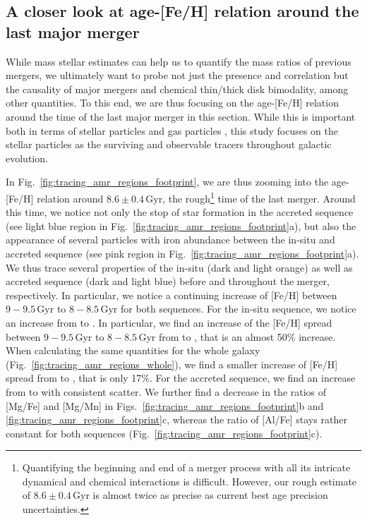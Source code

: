 \documentclass[fleqn,usenatbib]{mnras}
\begin{document}
\subsection{A closer look at age-[Fe/H] relation around the last major merger} \label{sec:discussion_zoom_at_mergertime}

While mass stellar estimates can help us to quantify the mass ratios of previous mergers, we ultimately want to probe not just the presence and correlation but the causality of major mergers and chemical thin/thick disk bimodality, among other quantities. To this end, we are thus focusing on the age-[Fe/H] relation around the time of the last major merger in this section. While this is important both in terms of stellar particles and gas particles \citep[see e.g. the study by][]{Buck2023}, this study focuses on the stellar particles as the surviving and observable tracers throughout galactic evolution.

In Fig.~\ref{fig:tracing_amr_regions_footprint}, we are thus zooming into the age-[Fe/H] relation around $8.6\pm0.4\,\mathrm{Gyr}$, the rough\footnote{Quantifying the beginning and end of a merger process with all its intricate dynamical and chemical interactions is difficult. However, our rough estimate of $8.6\pm0.4\,\mathrm{Gyr}$ is almost twice as precise as current best age precision uncertainties.} time of the last merger. Around this time, we notice not only the stop of star formation in the accreted sequence (see light blue region in Fig.~\ref{fig:tracing_amr_regions_footprint}a), but also the appearance of several particles with iron abundance between the in-situ and accreted sequence (see pink region in Fig.~\ref{fig:tracing_amr_regions_footprint}a). We thus trace several properties of the in-situ (dark and light orange) as well as accreted sequence (dark and light blue) before and throughout the merger, respectively. In particular, we notice a continuing increase of [Fe/H] between $9-9.5\,\mathrm{Gyr}$ to $8-8.5\,\mathrm{Gyr}$ for both sequences. For the in-situ sequence, we notice an increase from  to . In particular, we find an increase of the [Fe/H] spread between $9-9.5\,\mathrm{Gyr}$ to $8-8.5\,\mathrm{Gyr}$ from 
 to , that is an almost 50\% increase. When calculating the same quantities for the whole galaxy (Fig.~\ref{fig:tracing_amr_regions_whole}), we find a smaller increase of [Fe/H] spread from  to , that is only 17\%. For the accreted sequence, we find an increase from  to  with consistent scatter. We further find a decrease in the ratios of [Mg/Fe] and [Mg/Mn] in Figs.~\ref{fig:tracing_amr_regions_footprint}b and \ref{fig:tracing_amr_regions_footprint}c, whereas the ratio of [Al/Fe] stays rather constant for both sequences (Fig.~\ref{fig:tracing_amr_regions_footprint}c).
\end{document}
